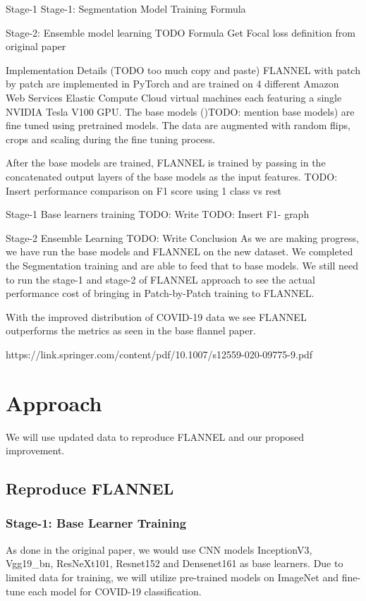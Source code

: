 \documentclass{sigkddExp}
\begin{document}
Stage-1 Stage-1: Segmentation Model Training Formula



Stage-2: Ensemble model learning TODO Formula Get Focal loss definition from
original paper


Implementation Details (TODO too much copy and paste) FLANNEL with patch by
patch are implemented in PyTorch and are trained on 4 different Amazon Web
Services Elastic Compute Cloud virtual machines each featuring a single NVIDIA
Tesla V100 GPU. The base models ()TODO: mention base models) are fine tuned
using pretrained models. The data are augmented with random flips, crops and
scaling during the fine tuning process.

After the base models are trained, FLANNEL is trained by passing in the
concatenated output layers of the base models as the input features. TODO:
Insert performance comparison on F1 score using 1 class vs rest

Stage-1 Base learners training TODO: Write TODO: Insert F1- graph


Stage-2 Ensemble Learning TODO: Write Conclusion As we are making progress, we
have run the base models and FLANNEL on the new dataset. We completed the
Segmentation training and are able to feed that to base models. We still need to
run the stage-1 and stage-2 of FLANNEL approach to see the actual performance
cost of bringing in Patch-by-Patch training to FLANNEL.

With the improved distribution of COVID-19 data we see FLANNEL outperforms the
metrics as seen in the base flannel paper.

https://link.springer.com/content/pdf/10.1007/s12559-020-09775-9.pdf


\section{Approach}

We will use updated data to reproduce FLANNEL and our proposed improvement.

\subsection{Reproduce FLANNEL}
\subsubsection{Stage-1: Base Learner Training}
As done in the original paper, we would use CNN models InceptionV3, Vgg19\_bn,
ResNeXt101, Resnet152 and Densenet161 as base learners. Due to limited data for
training, we will utilize pre-trained models on ImageNet and fine-tune each
model for COVID-19 classification.
\end{document}
